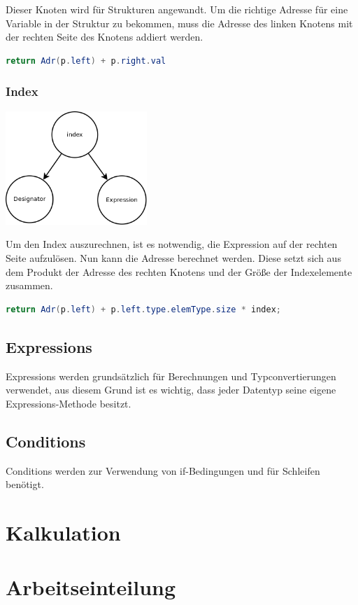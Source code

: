 Dieser Knoten wird für Strukturen angewandt. Um die richtige Adresse für eine Variable in der Struktur zu bekommen, muss die Adresse des linken
Knotens mit der rechten Seite des Knotens addiert werden.

\begin{lstlisting}[language=JAVA]
return Adr(p.left) + p.right.val
\end{lstlisting}

\subsubsection{Index}
\includegraphics[width=0.4\textwidth]{./media/images/interpreter/syntaxbaum/designators/index.png}

Um den Index auszurechnen, ist es notwendig, die Expression auf der rechten Seite aufzulösen.
Nun kann die Adresse berechnet werden. Diese setzt sich aus dem Produkt der Adresse des rechten Knotens und der Größe der Indexelemente zusammen.

\begin{lstlisting}[language=JAVA]
return Adr(p.left) + p.left.type.elemType.size * index;
\end{lstlisting}

\subsection{Expressions}
Expressions werden grundsätzlich für Berechnungen und Typconvertierungen verwendet, aus diesem Grund ist es wichtig, dass jeder Datentyp seine
eigene Expressions-Methode besitzt.

\subsection{Conditions}
Conditions werden zur Verwendung von if-Bedingungen und für Schleifen benötigt.

\section{Kalkulation}


\section{Arbeitseinteilung}
